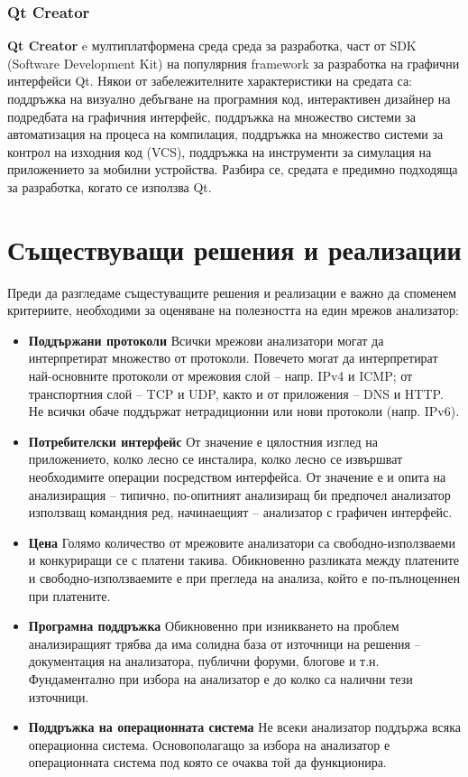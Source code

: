 \documentclass[12pt,a4paper,oneside]{book}
\begin{document}
\subsubsection{Qt Creator}

\textbf{Qt Creator} e мултиплатформена среда среда за разработка, част от
SDK (Software Development Kit) на популярния framework за разработка на графични
интерфейси Qt. Някои от забележителните характеристики на средата са: поддръжка
на визуално дебъгване на програмния код, интерактивен дизайнер на подредбата на
графичния интерфейс, поддръжка на множество системи за автоматизация на процеса
на компилация, поддръжка на множество системи за контрол на изходния код (VCS),
поддръжка на инструменти за симулация на приложението за мобилни устройства.
Разбира се, средата е предимно подходяща за разработка, когато се използва Qt.

\section{Съществуващи решения и реализации}

Преди да разгледаме същестуващите решения и реализации е важно да споменем
критериите, необходими за оценяване на полезността на един мрежов анализатор:

\begin{itemize}
  \item \textbf{Поддържани протоколи} Всички мрежови анализатори могат да
    интерпретират множество от протоколи. Повечето могат да интерпретират
    най-основните протоколи от мрежовия слой -- напр. IPv4 и ICMP; от
    транспортния слой -- TCP и UDP, както и от приложения -- DNS и HTTP.
    Не всички обаче поддържат нетрадиционни или нови протоколи (напр. IPv6).
  \item \textbf{Потребителски интерфейс} От значение е цялостния изглед на
    приложението, колко лесно се инсталира, колко лесно се извършват
    необходимите операции посредством интерфейса. От значение е и опита на
    анализиращия -- типично, по-опитният анализиращ би предпочел анализатор
    използващ командния ред, начинаещият -- анализатор с графичен интерфейс.
  \item \textbf{Цена} Голямо количество от мрежовите анализатори са
    свободно-използваеми и конкуриращи се с платени такива. Обикновенно
    разликата между платените и свободно-използваемите е при прегледа на
    анализа, който е по-пълноценнен при платените.
  \item \textbf{Програмна поддръжка} Обикновенно при изникването на проблем
    анализиращият трябва да има солидна база от източници на решения --
    документация на анализатора, публични форуми, блогове и т.н. Фундаментално
    при избора на анализатор е до колко са налични тези източници.
  \item \textbf{Поддръжка на операционната система} Не всеки анализатор поддържа
    всяка операционна система. Основополагащо за избора на анализатор е
    операционната система под която се очаква той да функционира.
\end{itemize}
\end{document}
